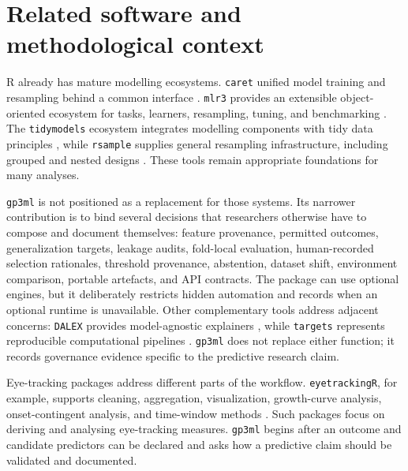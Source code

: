 \section{Related software and methodological context}\label{related-software-and-methodological-context}

R already has mature modelling ecosystems. \texttt{caret} unified model training and resampling behind a common interface \citep{Kuhn2008}. \texttt{mlr3} provides an extensible object-oriented ecosystem for tasks, learners, resampling, tuning, and benchmarking \citep{Lang2019}. The \texttt{tidymodels} ecosystem integrates modelling components with tidy data principles \citep{KuhnSilge2022}, while \texttt{rsample} supplies general resampling infrastructure, including grouped and nested designs \citep{rsample2026}. These tools remain appropriate foundations for many analyses.

\texttt{gp3ml} is not positioned as a replacement for those systems. Its narrower contribution is to bind several decisions that researchers otherwise have to compose and document themselves: feature provenance, permitted outcomes, generalization targets, leakage audits, fold-local evaluation, human-recorded selection rationales, threshold provenance, abstention, dataset shift, environment comparison, portable artefacts, and API contracts. The package can use optional engines, but it deliberately restricts hidden automation and records when an optional runtime is unavailable. Other complementary tools address adjacent concerns: \texttt{DALEX} provides model-agnostic explainers \citep{Biecek2018}, while \texttt{targets} represents reproducible computational pipelines \citep{Landau2021}. \texttt{gp3ml} does not replace either function; it records governance evidence specific to the predictive research claim.

Eye-tracking packages address different parts of the workflow. \texttt{eyetrackingR}, for example, supports cleaning, aggregation, visualization, growth-curve analysis, onset-contingent analysis, and time-window methods \citep{DinkFerguson2015}. Such packages focus on deriving and analysing eye-tracking measures. \texttt{gp3ml} begins after an outcome and candidate predictors can be declared and asks how a predictive claim should be validated and documented.

